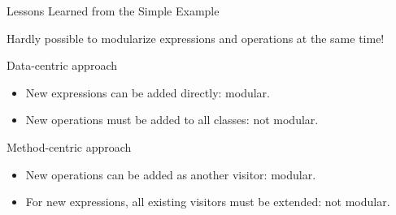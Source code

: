 \begin{frame}{Lessons Learned from the Simple Example}
	\begin{note}{}
		Hardly possible to modularize expressions and operations at the same time!
	\end{note}
	\pause
	\begin{mycolumns}[widths={50,50},animation=none]
		\begin{note}{Data-centric approach}
			\begin{itemize}
				\item New expressions can be added directly: modular.
				\item New operations must be added to all classes: not modular.
			\end{itemize}
		\end{note}
	\mynextcolumn
		\begin{note}{Method-centric approach}
			\begin{itemize}
				\item New operations can be added as another visitor: modular.
				\item For new expressions, all existing visitors must be extended: not modular.
			\end{itemize}
		\end{note}	
	\end{mycolumns}
\end{frame}